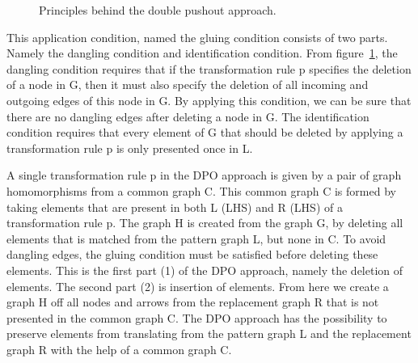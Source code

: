  \begin{figure}[H]
 	\centering
 	\caption[The Double Pushout approach]
 	{Principles behind the double pushout approach.}
 	\label{fig:DPO}
 \end{figure}


\noindent This application condition, named the gluing condition\cite{Loewe1997}
consists of two parts. Namely the dangling condition and identification
condition. From figure~\ref{fig:DPO}, the dangling condition requires that if
the transformation rule p specifies the deletion of a node in G, then it must also
specify the deletion of all incoming and outgoing edges of this node in G. By
applying this condition, we can be sure that there are no dangling edges after
deleting a node in G. The identification condition requires that every element
of G that should be deleted by applying a transformation rule p is only
presented once in L. 

A single transformation rule p in the DPO approach is given by a pair of graph
homomorphisms from a common graph C. This common graph C is formed by taking
elements that are present in both L (LHS) and R (LHS) of a transformation rule
p. The graph H is created from the graph G, by deleting all elements that is
matched from the pattern graph L, but none in C. To avoid dangling edges,
the gluing condition must be satisfied before deleting these elements. This is
the first part (1) of the DPO approach, namely the deletion of elements. The
second part (2) is insertion of elements. From here we create a graph H off all
nodes and arrows from the replacement graph R that is not presented in the
common graph C. The DPO approach has the possibility to preserve elements from
translating from the pattern graph L and the replacement graph R with the help
of a common graph C.

